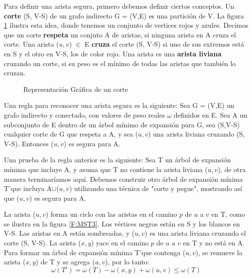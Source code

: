 \documentclass[a4paper, 11pt]{report}
\newcommand{\DrawEJcGraph}[5]{

    \begin{scope}[#4]
    \foreach \pos/\nodo in {{(0,0)/4}, {(0,2.2)/5}, {(1.5,1.7)/7}, {(3,3)/1}, {(3,1)/0}, {(4.5,1.7)/2}, {(4.5,3)/3}, {(7,0)/6}}
        \node[vertex] (#3\nodo) at \pos {\nodo};
    \foreach \start/\end in {4/5, 5/7, 7/1,7/0,0/2,2/3,2/6,4/7,1/5,0/4,1/2,1/3,2/7,3/6,6/0,6/4}
        \path[edge,#5] (#3\start) -- (#3\end);

    \foreach \nodo in {#1}
        \node[selected vertex] at (#3\nodo) {\nodo};

    \begin{pgfonlayer}{background}
        \foreach \start/\end in {#2}
            \path[selected edge,#5] (#3\start) -- (#3\end);
    \end{pgfonlayer}
    \begin{pgfonlayer}{background}
        \foreach \start/\end in {#3}
            \path[ignored edge,#5] (#3\start) -- (#3\end);
    \end{pgfonlayer}
    \end{scope}

}
\begin{document}
Para definir una arista segura, primero debemos definir ciertos conceptos. Un \textbf{corte} (S, V-S) de un grafo indirecto G = (V,E) es una partición de V. La figura \ref{MST2} ilustra esta idea, donde tenemos un conjunto de vertices rojos y azules. Decimos que un corte \textbf{respeta} un conjuto A de aristas, si ninguna arista en A cruza el corte. Una arista ($u,v$) $\in$ E \textbf{cruza} el corte (S, V-S) si uno de sus extremos está en S y el otro en V-S, los de color rojo. Una arista es una \textbf{arista liviana} cruzando un corte, si su peso es el mínimo de todas las aristas que también lo cruzan.

\begin{figure}[!h]
    \centering
    \caption{Representaci\'on Gr\'afica de un corte}
    \label{MST2}
\end{figure}

Una regla para reconocer una arista segura es la siguiente: Sea G = (V,E) un grafo indirecto y conectado, con valores de peso reales $\omega$ definidos en E. Sea A un subconjunto de E dentro de un árbol mínimo de expansión para G, sea (S,V-S) cualquier corte de G que respeta a A, y sea ($u, v$) una arista liviana cruzando (S, V-S). Entonces ($u, v$) es segura para A.

Una prueba de la regla anterior es la siguiente:
Sea T un árbol de expansión mínima que incluye A, y asuma que T no contiene la arista liviana ($u,v$), de otra manera terminaríamos aquí. Debemos construir otro árbol de expansión mínima T'que incluya A$\cup${($u,v$)} utilizando una técnica de "corte y pegue", mostrando así que ($u,v$) es segura para A.

La arista ($u, v$) forma un ciclo con las aristas en el camino $p$ de $u$ a $v$ en T, como se ilustra en la figura \ref{F:MST3}. Los vértices negros están en S y los blancos en V-S. Las aristas en A están sombreadas, y ($u, v$) es una arista liviana cruzando el corte (S, V-S). La arista ($x, y$) yace en el camino $p$ de $u$ a $v$ en T y no está en A. Para formar un árbol de expansión mínima T'que contenga ($u, v$), se remueve la arista ($x, y$) de T y se agrega ($u, v$), por lo tanto:
\begin{equation}
\omega(T') = \omega(T) - \omega(x,y) + \omega(u,v)\leq \omega(T) 
\end{equation}
\end{document}
